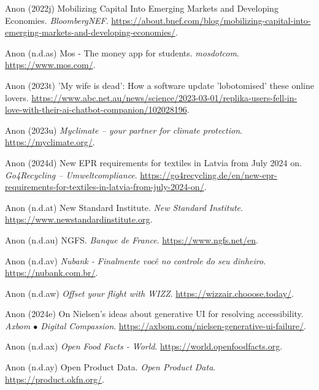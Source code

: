 \documentclass[
  letterpaper,
  DIV=11,
  numbers=noendperiod]{scrartcl}
\newlength{\cslhangindent}
\newenvironment{CSLReferences}[2] %
 {\begin{list}{}{%
  \setlength{\itemindent}{0pt}
  \setlength{\leftmargin}{0pt}
  \setlength{\parsep}{0pt}
  \ifodd #1
   \setlength{\leftmargin}{\cslhangindent}
   \setlength{\itemindent}{-1\cslhangindent}
  \fi
  \setlength{\itemsep}{#2\baselineskip}}}
 {\end{list}}
\begin{document}
\begin{CSLReferences}{0}{1}
Anon (2022j) Mobilizing {Capital Into Emerging Markets} and {Developing
Economies}. \emph{BloombergNEF}.
\url{https://about.bnef.com/blog/mobilizing-capital-into-emerging-markets-and-developing-economies/}.

Anon (n.d.as) Mos - {The} money app for students. \emph{mosdotcom}.
\url{https://www.mos.com/}.

Anon (2023t) '{My} wife is dead': {How} a software update 'lobotomised'
these online lovers.
\url{https://www.abc.net.au/news/science/2023-03-01/replika-users-fell-in-love-with-their-ai-chatbot-companion/102028196}.

Anon (2023u) \emph{Myclimate -- your partner for climate protection}.
\url{https://myclimate.org/}.

Anon (2024d) New {EPR} requirements for textiles in {Latvia} from {July}
2024 on. \emph{Go4Recycling -- Umweltcompliance}.
\url{https://go4recycling.de/en/new-epr-requirements-for-textiles-in-latvia-from-july-2024-on/}.

Anon (n.d.at) New {Standard Institute}. \emph{New Standard Institute}.
\url{https://www.newstandardinstitute.org}.

Anon (n.d.au) {NGFS}. \emph{Banque de France}.
\url{https://www.ngfs.net/en}.

Anon (n.d.av) \emph{Nubank - {Finalmente} voc{ê} no controle do seu
dinheiro}. \url{https://nubank.com.br/}.

Anon (n.d.aw) \emph{Offset your flight with {WIZZ}}.
\url{https://wizzair.chooose.today/}.

Anon (2024e) On {Nielsen}'s ideas about generative {UI} for resolving
accessibility. \emph{Axbom {\(\bullet\)} Digital Compassion}.
\url{https://axbom.com/nielsen-generative-ui-failure/}.

Anon (n.d.ax) \emph{Open {Food Facts} - {World}}.
\url{https://world.openfoodfacts.org}.

Anon (n.d.ay) Open {Product Data}. \emph{Open Product Data}.
\url{https://product.okfn.org/}.


\end{CSLReferences}
\end{document}
